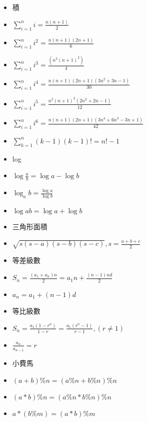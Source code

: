 \begin{itemize}
\item 積
\item $\sum \limits_{i=1}^n i = \frac{n(n+1)}{2}$
\item $\sum \limits_{i=1}^n i^2 = \frac{n(n+1)(2n+1)}{6}$
\item $\sum \limits_{i=1}^n i^3 = \frac{(n^2(n+1)^2)}{4}$
\item $\sum \limits_{i=1}^n i^4 = \frac{n(n+1)(2n+1)(3n^2+3n-1)}{30}$
\item $\sum \limits_{i=1}^n i^5 = \frac{n^2(n+1)^2(2n^2+2n-1)}{12}$
\item $\sum \limits_{i=1}^n i^6 = \frac{n(n+1)(2n+1)(3n^4+6n^3-3n+1)}{42}$
\item $\sum \limits_{k=1}^n (k-1)(k-1)! = n!-1$

\item log
\item $\log\frac{a}{b} = \log a - \log b$
\item $\log_a b = \frac{\log a}{\log b}$
\item $\log ab = \log a + \log b$

\item 三角形面積
\item $\sqrt{s(s-a)(s-b)(s-c)}, s = \frac{a+b+c}{2}$

\item 等差級數
\item $S_n = \frac{(a_1 + a_n)n}{2} = a_1n + \frac{(n-1)nd}{2}$
\item $a_n = a_1 + (n-1)d$

\item 等比級數
\item $S_n = \frac{a_1(1-r^n)}{1-r} = \frac{a_1(r^n-1)}{r-1}, (r \neq 1)$
\item $\frac{a_n}{a_{n-1}} = r$

\item 小費馬
\item $(a+b)\%n = (a\%n+b\%n)\%n$
\item $(a*b)\%n = (a\%n*b\%n)\%n$
\item $a*(b\%m) = (a*b)\%m$
\end{itemize}
